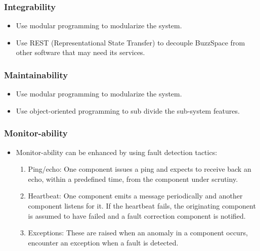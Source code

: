 \subsubsection*{Integrability}
	\begin{itemize}
		\item Use modular programming to modularize the system. 
		\item Use REST (Representational State Transfer) to decouple BuzzSpace from other software that may need its services.
	\end{itemize}
\subsubsection*{Maintainability}
	\begin{itemize}
		\item Use modular programming to modularize the system.
		\item Use object-oriented programming to sub divide the sub-system features.
	\end{itemize}
\subsubsection*{Monitor-ability}
	\begin{itemize}
		\item Monitor-ability can be enhanced by using fault detection tactics:
		\begin{enumerate}
			\item Ping/echo: One component issues a ping and expects to receive back an echo, within a predefined time, from the component under scrutiny.
			\item Heartbeat: One component emits a message periodically and another component listens for it. If the heartbeat fails, the originating component is assumed to have failed and a fault correction component is notified.
			\item Exceptions: These are raised when an anomaly in a component occurs, encounter an exception when a fault is detected.
		\end{enumerate}
	\end{itemize}
